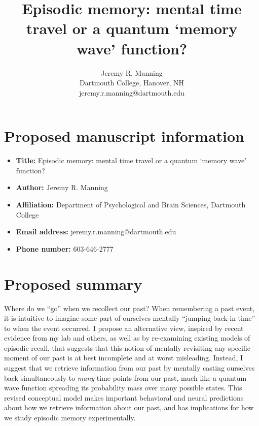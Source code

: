 \documentclass[12pt]{article}
\title{Episodic memory: mental time travel or a quantum `memory wave' function?}
\author{Jeremy R. Manning\\Dartmouth College, Hanover, NH\\jeremy.r.manning@dartmouth.edu}
\begin{document}
\section*{Proposed manuscript information}
\begin{itemize}
  \item \textbf{Title:} Episodic memory: mental time travel or a quantum `memory wave' function?
  \item \textbf{Author:} Jeremy R. Manning
  \item \textbf{Affiliation:} Department of Psychological and Brain Sciences, Dartmouth College
  \item \textbf{Email address:} jeremy.r.manning@dartmouth.edu
  \item \textbf{Phone number:} 603-646-2777
\end{itemize}

\section*{Proposed summary}
Where do we ``go'' when we recollect our past?  When remembering a past event, it is intuitive to imagine some part of ourselves mentally ``jumping back in time'' to when the event occurred. I propose an alternative view, inspired by recent evidence from my lab and others, as well as by re-examining existing models of episodic recall, that suggests that this notion of mentally revisiting any specific moment of our past is at best incomplete and at worst misleading.  Instead, I suggest that we retrieve information from our past by mentally casting ourselves back simultaneously to \textit{many} time points from our past, much like a quantum wave function spreading its probability mass over many possible states.  This revised conceptual model makes important behavioral and neural predictions about how we retrieve information about our past, and has implications for how we study episodic memory experimentally.
\end{document}
